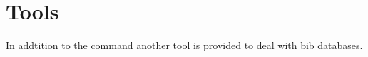 
\chapter{Tools}

In addtition to the command  another tool is provided to
deal with bib databases.




\endinput
%
